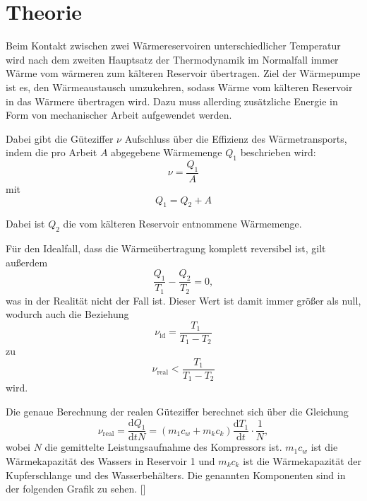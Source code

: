 \section{Theorie}
\label{sec:Theorie}

Beim Kontakt zwischen zwei Wärmereservoiren unterschiedlicher Temperatur wird nach dem zweiten Hauptsatz der Thermodynamik
im Normalfall immer Wärme vom wärmeren zum kälteren Reservoir übertragen. Ziel der Wärmepumpe ist es, den Wärmeaustausch umzukehren,
sodass Wärme vom kälteren Reservoir in das Wärmere übertragen wird. Dazu muss allerding zusätzliche Energie in Form von mechanischer
Arbeit aufgewendet werden.

Dabei gibt die Güteziffer $\nu$ Aufschluss über die Effizienz des Wärmetransports, indem die pro Arbeit $A$ abgegebene 
Wärmemenge $Q_1$ beschrieben wird:
\begin{equation}
    \nu = \frac{Q_1}A 
\end{equation}
mit
\begin{equation}
    Q_1 = Q_2 + A 
\end{equation}

Dabei ist $Q_2$ die vom kälteren Reservoir entnommene Wärmemenge.

Für den Idealfall, dass die Wärmeübertragung komplett reversibel ist, gilt außerdem 
\begin{equation}
    \frac{Q_1}{T_1} - \frac{Q_2}{T_2} = 0,
\end{equation}
was in der Realität nicht der Fall ist. Dieser Wert ist damit immer größer als null, wodurch auch die Beziehung
\begin{equation}
    \nu_{\text{id}} = \frac{T_1}{T_1 - T_2}
\end{equation}
zu 
\begin{equation}
    \nu_{\text{real}} < \frac{T_1}{T_1 - T_2}
\end{equation}
wird.

Die genaue Berechnung der realen Güteziffer berechnet sich über die Gleichung 
\begin{equation}
    \nu_\text{real} = \frac{\text{d}Q_1}{\text{d}tN} = (m_1c_w + m_kc_k)\frac{\text{d}T_1}{\text{d}t}\cdot\frac{1}N,
    \label{eqn:nureal}
\end{equation}
wobei $N$ die gemittelte Leistungsaufnahme des Kompressors ist. $m_1c_w$ ist die Wärmekapazität des Wassers in Reservoir 1 und 
$m_kc_k$ ist die Wärmekapazität der Kupferschlange und des Wasserbehälters. Die genannten Komponenten sind in der folgenden Grafik
zu sehen. []

